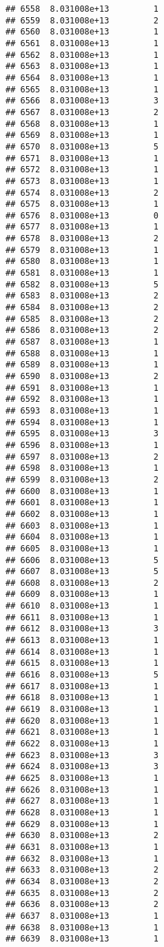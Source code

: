 \documentclass[
]{article}
\begin{document}
\begin{verbatim}
## 6558  8.031008e+13         1
## 6559  8.031008e+13         2
## 6560  8.031008e+13         1
## 6561  8.031008e+13         1
## 6562  8.031008e+13         1
## 6563  8.031008e+13         1
## 6564  8.031008e+13         1
## 6565  8.031008e+13         1
## 6566  8.031008e+13         3
## 6567  8.031008e+13         2
## 6568  8.031008e+13         1
## 6569  8.031008e+13         1
## 6570  8.031008e+13         5
## 6571  8.031008e+13         1
## 6572  8.031008e+13         1
## 6573  8.031008e+13         1
## 6574  8.031008e+13         2
## 6575  8.031008e+13         1
## 6576  8.031008e+13         0
## 6577  8.031008e+13         1
## 6578  8.031008e+13         2
## 6579  8.031008e+13         1
## 6580  8.031008e+13         1
## 6581  8.031008e+13         1
## 6582  8.031008e+13         5
## 6583  8.031008e+13         2
## 6584  8.031008e+13         2
## 6585  8.031008e+13         2
## 6586  8.031008e+13         2
## 6587  8.031008e+13         1
## 6588  8.031008e+13         1
## 6589  8.031008e+13         1
## 6590  8.031008e+13         2
## 6591  8.031008e+13         1
## 6592  8.031008e+13         1
## 6593  8.031008e+13         1
## 6594  8.031008e+13         1
## 6595  8.031008e+13         3
## 6596  8.031008e+13         1
## 6597  8.031008e+13         2
## 6598  8.031008e+13         1
## 6599  8.031008e+13         2
## 6600  8.031008e+13         1
## 6601  8.031008e+13         1
## 6602  8.031008e+13         1
## 6603  8.031008e+13         1
## 6604  8.031008e+13         1
## 6605  8.031008e+13         1
## 6606  8.031008e+13         5
## 6607  8.031008e+13         5
## 6608  8.031008e+13         2
## 6609  8.031008e+13         1
## 6610  8.031008e+13         1
## 6611  8.031008e+13         1
## 6612  8.031008e+13         3
## 6613  8.031008e+13         1
## 6614  8.031008e+13         1
## 6615  8.031008e+13         1
## 6616  8.031008e+13         5
## 6617  8.031008e+13         1
## 6618  8.031008e+13         1
## 6619  8.031008e+13         1
## 6620  8.031008e+13         1
## 6621  8.031008e+13         1
## 6622  8.031008e+13         1
## 6623  8.031008e+13         3
## 6624  8.031008e+13         3
## 6625  8.031008e+13         1
## 6626  8.031008e+13         1
## 6627  8.031008e+13         1
## 6628  8.031008e+13         1
## 6629  8.031008e+13         1
## 6630  8.031008e+13         2
## 6631  8.031008e+13         1
## 6632  8.031008e+13         1
## 6633  8.031008e+13         2
## 6634  8.031008e+13         2
## 6635  8.031008e+13         2
## 6636  8.031008e+13         2
## 6637  8.031008e+13         1
## 6638  8.031008e+13         1
## 6639  8.031008e+13         1

\end{verbatim}
\end{document}
